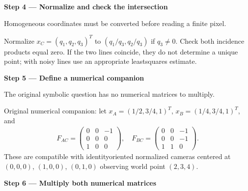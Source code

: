 \documentclass[letterpaper,11pt,english,openany,oneside]{jupyterBook}
\begin{document}
\par\medskip{}
{\color{QuizStepRed}\bfseries Step 4 — Normalize and check the intersection}\par\smallskip

\sphinxAtStartPar
{} Homogeneous coordinates must be converted before reading a finite pixel.

\sphinxAtStartPar
Normalize {\color{QuizMathBlue} \(x_C=(q_1,q_2,q_3)^T\)} to {\color{QuizMathBlue} \((q_1/q_3,q_2/q_3)\)} if {\color{QuizMathBlue} \(q_3\ne0\)}. Check both incidence products equal zero. If the two lines coincide, they do not determine a unique point; with noisy lines use an appropriate least\sphinxhyphen{}squares estimate.

\par

\par\medskip{}
{\color{QuizStepRed}\bfseries Step 5 — Define a numerical companion}\par\smallskip

\sphinxAtStartPar
{} The original symbolic question has no numerical matrices to multiply.

\sphinxAtStartPar
Original numerical companion: let {\color{QuizMathBlue} \(x_A=(1/2,3/4,1)^T\)}, {\color{QuizMathBlue} \(x_B=(1/4,3/4,1)^T\)}, and
{\color{QuizMathBlue} \begin{equation*}
\begin{split}
F_{AC}=\begin{pmatrix}0&0&-1\\0&0&0\\1&0&0\end{pmatrix},\quad
F_{BC}=\begin{pmatrix}0&0&-1\\0&0&-1\\1&1&0\end{pmatrix}.
\end{split}
\end{equation*}}
\sphinxAtStartPar
These are compatible with identity\sphinxhyphen{}oriented normalized cameras centered at {\color{QuizMathBlue} \((0,0,0)\)}, {\color{QuizMathBlue} \((1,0,0)\)}, {\color{QuizMathBlue} \((0,1,0)\)} observing world point {\color{QuizMathBlue} \((2,3,4)\)}.

\par

\par\medskip{}
{\color{QuizStepRed}\bfseries Step 6 — Multiply both numerical matrices}\par\smallskip
\end{document}
